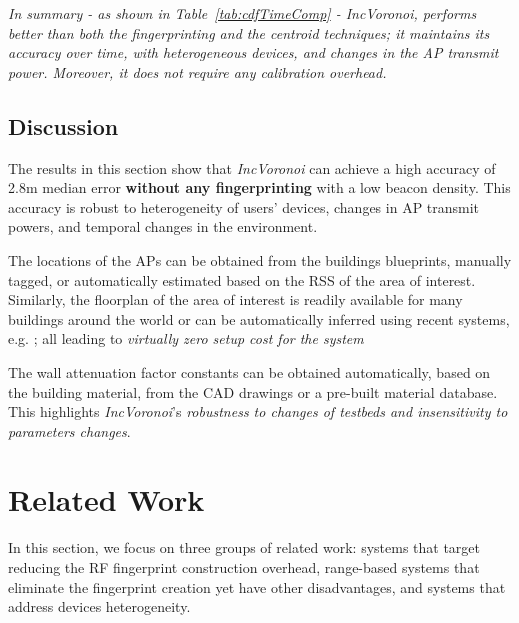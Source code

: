 \documentclass[conference]{IEEEtran}
\def \sys {\textit{IncVoronoi}}
\begin{document}
\emph{In summary - as shown in Table~\ref{tab:cdfTimeComp} - \sys{}, performs better than both the fingerprinting and the centroid techniques; it maintains its accuracy over time, with heterogeneous devices, and changes in the AP transmit power. Moreover, it does not require any calibration overhead.
}

\subsection{Discussion}\label{sec:locest}
The results in this section show that \sys{} can achieve a high accuracy of 2.8m median error \textbf{without any fingerprinting} with a low beacon density. This accuracy is robust to heterogeneity of users' devices, changes in AP transmit powers, and temporal changes in the environment.

The locations of the APs can be obtained from the buildings blueprints, manually tagged, or automatically estimated based on the RSS of the area of interest. Similarly, the floorplan of the area of interest is readily available for many buildings around the world or can be automatically inferred using recent systems, e.g. \cite{crowdinside,elhamshary2014checkinside,elhamshary2015semsense,elhamshary2016transitlabel}; all leading to \emph{virtually zero setup cost for the system}

The wall attenuation factor constants can be obtained automatically, based on the building material, from the CAD drawings or a pre-built material database. This highlights \sys{}'s\emph{ robustness to changes of testbeds and insensitivity to parameters changes}.

\section{Related Work}
\label{sec:related}

In this section, we focus on three groups of related work: systems that target reducing the RF fingerprint construction overhead, range-based 
 systems that eliminate the fingerprint creation yet have other disadvantages, and systems that address devices heterogeneity.
\end{document}
